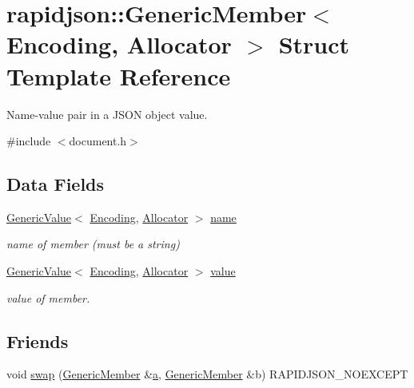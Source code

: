 \hypertarget{structrapidjson_1_1_generic_member}{}\section{rapidjson\+::Generic\+Member$<$ Encoding, Allocator $>$ Struct Template Reference}
\label{structrapidjson_1_1_generic_member}


Name-\/value pair in a J\+S\+ON object value.  




{\ttfamily \#include $<$document.\+h$>$}

\subsection*{Data Fields}
\begin{DoxyCompactItemize}
\item 
\mbox{\hyperlink{classrapidjson_1_1_generic_value}{Generic\+Value}}$<$ \mbox{\hyperlink{classrapidjson_1_1_encoding}{Encoding}}, \mbox{\hyperlink{classrapidjson_1_1_allocator}{Allocator}} $>$ \mbox{\hyperlink{structrapidjson_1_1_generic_member_ae820eaa74b415a9073f3f3855f6c6607}{name}}
\begin{DoxyCompactList}\small\item\em name of member (must be a string) \end{DoxyCompactList}\item 
\mbox{\hyperlink{classrapidjson_1_1_generic_value}{Generic\+Value}}$<$ \mbox{\hyperlink{classrapidjson_1_1_encoding}{Encoding}}, \mbox{\hyperlink{classrapidjson_1_1_allocator}{Allocator}} $>$ \mbox{\hyperlink{structrapidjson_1_1_generic_member_a8ffff2076e62d988a070a136da6ffca6}{value}}
\begin{DoxyCompactList}\small\item\em value of member. \end{DoxyCompactList}\end{DoxyCompactItemize}
\subsection*{Friends}
\begin{DoxyCompactItemize}
\item 
void \mbox{\hyperlink{structrapidjson_1_1_generic_member_af72094da5f8967de3fab3d2c34bc71cc}{swap}} (\mbox{\hyperlink{structrapidjson_1_1_generic_member}{Generic\+Member}} \&\mbox{\hyperlink{namespacerapidjson_a11fce64e721729aaf6be4a485c78f231}{a}}, \mbox{\hyperlink{structrapidjson_1_1_generic_member}{Generic\+Member}} \&b) R\+A\+P\+I\+D\+J\+S\+O\+N\+\_\+\+N\+O\+E\+X\+C\+E\+PT
\end{DoxyCompactItemize}


